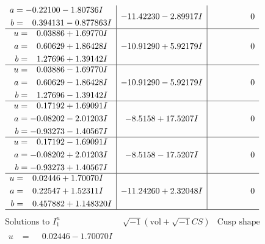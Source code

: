 \documentclass[1p]{elsarticle_modified}
\theoremstyle{definition}
\newcommand{\I}{\sqrt{-1}}
\begin{document}
$$\begin{array}{c|c|c}
\begin{aligned}
a &= -0.22100 - 1.80736 I \\
b &= \phantom{-}0.394131 - 0.877863 I\end{aligned}
 & -11.42230 - 2.89917 I & \phantom{-0.000000 } 0 \\ \hline\begin{aligned}
u &= \phantom{-}0.03886 + 1.69770 I \\
a &= \phantom{-}0.60629 + 1.86428 I \\
b &= \phantom{-}1.27696 + 1.39142 I\end{aligned}
 & -10.91290 + 5.92179 I & \phantom{-0.000000 } 0 \\ \hline\begin{aligned}
u &= \phantom{-}0.03886 - 1.69770 I \\
a &= \phantom{-}0.60629 - 1.86428 I \\
b &= \phantom{-}1.27696 - 1.39142 I\end{aligned}
 & -10.91290 - 5.92179 I & \phantom{-0.000000 } 0 \\ \hline\begin{aligned}
u &= \phantom{-}0.17192 + 1.69091 I \\
a &= -0.08202 - 2.01203 I \\
b &= -0.93273 - 1.40567 I\end{aligned}
 & -8.5158 + 17.5207 I & \phantom{-0.000000 } 0 \\ \hline\begin{aligned}
u &= \phantom{-}0.17192 - 1.69091 I \\
a &= -0.08202 + 2.01203 I \\
b &= -0.93273 + 1.40567 I\end{aligned}
 & -8.5158 - 17.5207 I & \phantom{-0.000000 } 0 \\ \hline\begin{aligned}
u &= \phantom{-}0.02446 + 1.70070 I \\
a &= \phantom{-}0.22547 + 1.52311 I \\
b &= \phantom{-}0.457882 + 1.148320 I\end{aligned}
 & -11.24260 + 2.32048 I & \phantom{-0.000000 } 0\\
 \hline 
 \end{array}$$\newpage$$\begin{array}{c|c|c}  
\text{Solutions to }I^u_{1}& \I (\text{vol} + \sqrt{-1}CS) & \text{Cusp shape}\\
 \hline 
\begin{aligned}
u &= \phantom{-}0.02446 - 1.70070 I \\

\end{aligned}
\end{array}$$
\end{document}

